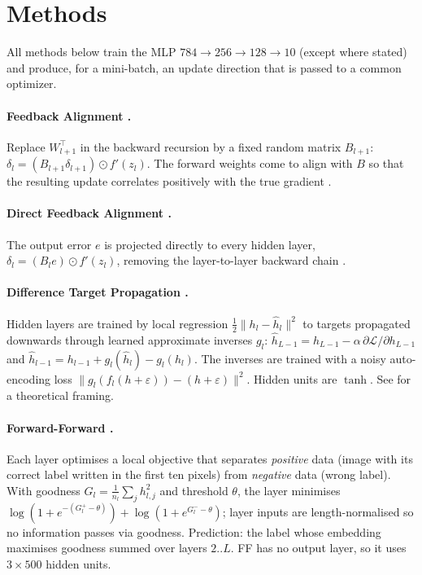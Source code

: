 \documentclass[11pt]{article}
\begin{document}
\section{Methods}\label{sec:methods}
All methods below train the MLP $784\!\to\!256\!\to\!128\!\to\!10$ (except where stated) and produce, for a mini-batch, an update direction that is passed to a common optimizer.

\paragraph{Feedback Alignment \cite{lillicrap2016}.} Replace $W_{l+1}^\top$ in the backward recursion by a fixed random matrix $B_{l+1}$: $\delta_l=(B_{l+1}\delta_{l+1})\odot f'(z_l)$. The forward weights come to align with $B$ so that the resulting update correlates positively with the true gradient \cite{lillicrap2016,refinetti2021}.

\paragraph{Direct Feedback Alignment \cite{nokland2016}.} The output error $e$ is projected directly to every hidden layer, $\delta_l=(B_l e)\odot f'(z_l)$, removing the layer-to-layer backward chain \cite{launay2020}.

\paragraph{Difference Target Propagation \cite{lee2015dtp}.} Hidden layers are trained by local regression $\tfrac12\|h_l-\hat h_l\|^2$ to targets propagated downwards through learned approximate inverses $g_l$: $\hat h_{L-1}=h_{L-1}-\alpha\,\partial\mathcal L/\partial h_{L-1}$ and $\hat h_{l-1}=h_{l-1}+g_l(\hat h_l)-g_l(h_l)$. The inverses are trained with a noisy auto-encoding loss $\|g_l(f_l(h+\varepsilon))-(h+\varepsilon)\|^2$. Hidden units are $\tanh$. See \cite{meulemans2020} for a theoretical framing.

\paragraph{Forward-Forward \cite{hinton2022ff}.} Each layer optimises a local objective that separates \emph{positive} data (image with its correct label written in the first ten pixels) from \emph{negative} data (wrong label). With goodness $G_l=\frac1{n_l}\sum_j h_{l,j}^2$ and threshold $\theta$, the layer minimises $\log(1+e^{-(G_l^{+}-\theta)})+\log(1+e^{G_l^{-}-\theta})$; layer inputs are length-normalised so no information passes via goodness. Prediction: the label whose embedding maximises goodness summed over layers $2..L$. FF has no output layer, so it uses $3\times500$ hidden units.
\end{document}
